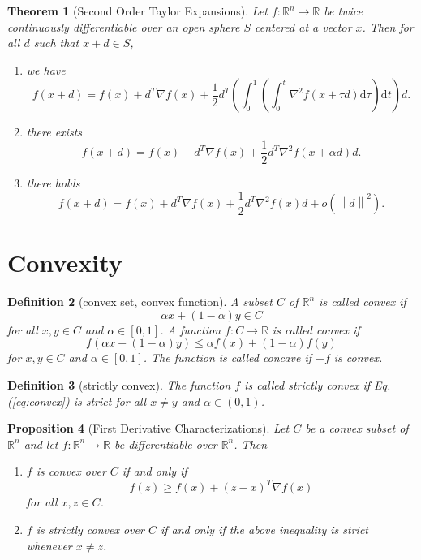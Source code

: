 \documentclass[12pt,a4paper]{article}
\numberwithin{equation}{section}
\theoremstyle{mystyle}
\newtheorem{definition}{Definition}[section]
\newtheorem{theorem}[definition]{Theorem}
\newtheorem{proposition}[definition]{Proposition}
\newcommand{\R}{\mathbb{R}}
\newcommand{\grad}{\nabla}
\renewcommand{\d}{\mathrm{d}}
\newcommand{\norm}[1]{\left\lVert #1 \right\rVert}
\begin{document}
	\begin{theorem}[Second Order Taylor Expansions]
		Let $f:\R^n \to \R$ be twice continuously differentiable over an open sphere $S$ centered at a vector $x$. Then for all $d$ such that $x+d\in S$,
		\begin{enumerate}
			\item we have
			$$
			f(x+d)=f(x)+d^T \grad f(x) +\frac{1}{2}d^T\left(\int_0^1\left(\int_0^t \grad^2 f(x+\tau d)\d \tau\right)\d t\right)d.
			$$
			\item there exists
			$$
			f(x+d)=f(x)+d^T \grad f(x)+\frac{1}{2}d^T \grad^2 f(x+\alpha d)d.
			$$
			\item there holds
			$$
			f(x+d)=f(x)+d^T \grad f(x)+\frac{1}{2}d^T \grad^2 f(x)d+o(\norm{d}^2).
			$$
		\end{enumerate}
	\end{theorem}


	\section{Convexity}
	\begin{definition}[convex set, convex function]
		A subset $C$ of $\R^n$ is called \emph{convex} if 
		$$
		\alpha x+(1-\alpha)y\in C
		$$ for all $x,y\in C$ and $\alpha\in [0,1]$. A function $f:C\to \R$ is called \emph{convex} if 
		\begin{equation}
			f(\alpha x+(1-\alpha )y)\leq 
			\alpha f(x)+(1-\alpha)f(y)\label{eq:convex}
		\end{equation}
		for $x,y\in C$ and $\alpha\in [0,1]$. The function is called \emph{concave} if $-f$ is convex.
	\end{definition}
	\begin{definition}[strictly convex]
		The function $f$ is called \emph{strictly convex} if Eq.(\ref{eq:convex}) is strict for all $x\neq y$ and $\alpha\in(0,1)$.
	\end{definition}

	\begin{proposition}[First Derivative Characterizations]
		Let $C$ be a convex subset of $\R^n$ and let $f:\R^n \to \R$ be differentiable over $\R^n$. Then
		\begin{enumerate}
			\item $f$ is convex over $C$ if and only if
			\begin{equation}
				f(z)\geq f(x)+(z-x)^T \grad f(x)
			\end{equation}
			for all $x,z\in C$.
			\item $f$ is strictly convex over $C$ if and only if the above inequality is strict whenever $x\neq z$.
		\end{enumerate}
	\end{proposition}
\end{document}
